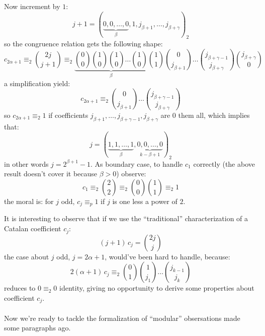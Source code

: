 \documentclass[11pt,a4paper]{article} %
\begin{document}
\begin{itemize}
            Now increment by $1$:
            \begin{displaymath}
                j+1=\left(\underbrace{0,0,\ldots,0}_{\beta},1,j_{\beta+1},\ldots,j_{\beta+\gamma}%
                    \right)_{2}
            \end{displaymath}
            so the congruence relation gets the following shape:
            \begin{displaymath}
                c_{2\alpha+1}\equiv_{2}{{2j}\choose{j+1}}
                    \equiv_{2} \underbrace{{{0}\choose{0}}{{1}\choose{0}}{{1}\choose{0}}\ldots{{1}\choose{0}}}_{\beta} 
                        {{1}\choose{1}}{{0}\choose{j_{\beta+1}}}
                        \ldots{{j_{\beta+\gamma-1}}\choose{j_{\beta+\gamma}}}{{j_{\beta+\gamma}}\choose{0}}%
            \end{displaymath}
            a simplification yield:
            \begin{displaymath}
                c_{2\alpha+1}\equiv_{2} {{0}\choose{j_{\beta+1}}}
                        \ldots{{j_{\beta+\gamma-1}}\choose{j_{\beta+\gamma}}}
            \end{displaymath}
            so $c_{2\alpha+1}\equiv_{2} 1$ if coefficients $j_{\beta+1}, \ldots, j_{\beta+\gamma-1},j_{\beta+\gamma}$
            are $0$ them all, which implies that:
            \begin{displaymath}
                j=\left(\underbrace{1,1,\ldots,1}_{\beta},\underbrace{0,0,\ldots,0}_{k-\beta+1}\right)_{2}
            \end{displaymath}
            in other words $j = 2^{\beta+1}-1$. As boundary case, to handle $c_{1}$ correctly 
            (the above result doesn't cover it because $\beta>0$) observe:
            \begin{displaymath}
                c_{1}\equiv_{2} {{2}\choose{2}}\equiv_{2} {{0}\choose{0}}{{1}\choose{1}}\equiv_{2}1
            \end{displaymath}
            the moral is: for $j$ odd, $c_{j} \equiv_{p} 1$ if $j$ is one less a power of $2$. 
    \end{itemize}

    It is interesting to observe that if we use the ``traditional'' characterization
    of a Catalan coefficient $c_{j}$:
    \begin{displaymath}
        (j+1)\,c_{j} = {{2j}\choose{j}} 
    \end{displaymath}
    the case about $j$ odd, $j=2\alpha+1$, would've been hard to handle, because:
    \begin{displaymath}
        2(\alpha+1)\,c_{j}\equiv_{2} {{0}\choose{1}}{{1}\choose{j_{1}}}
                \ldots{{j_{k-1}}\choose{j_{k}}}
    \end{displaymath}
    reduces to $0\equiv_{2}0$ identity, giving no opportunity to derive some
    properties about coefficient $c_{j}$.
    \\\\
    Now we're ready to tackle the formalization of ``modular'' obsersations
    made some paragraphs ago.
\end{document}
